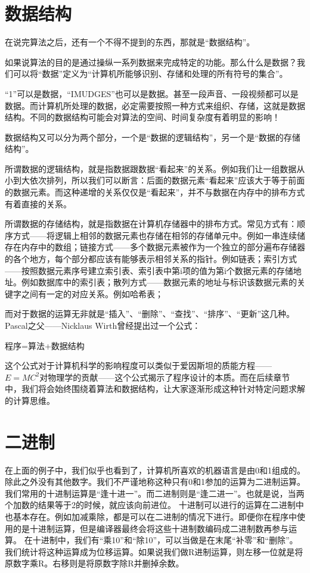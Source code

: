 \section{数据结构}
在说完算法之后，还有一个不得不提到的东西，那就是“数据结构”。

如果说算法的目的是通过操纵一系列数据来完成特定的功能。那么什么是数据？我们可以将“数据”定义为“计算机所能够识别、存储和处理的所有符号的集合”。

“1”可以是数据，“IMUDGES”也可以是数据。甚至一段声音、一段视频都可以是数据。而计算机所处理的数据，必定需要按照一种方式来组织、存储，这就是数据结构。不同的数据结构可能会对算法的空间、时间复杂度有着明显的影响！

数据结构又可以分为两个部分，一个是“数据的逻辑结构”，另一个是“数据的存储结构”。

所谓数据的逻辑结构，就是指数据跟数据“看起来”的关系。例如我们让一组数据从小到大依次排列，所以我们可以断言：后面的数据元素“看起来”应该大于等于前面的数据元素。而这种递增的关系仅仅是“看起来”，并不与数据在内存中的排布方式有着直接的关系。

所谓数据的存储结构，就是指数据在计算机存储器中的排布方式。常见方式有：顺序方式——将逻辑上相邻的数据元素也存储在相邻的存储单元中。例如一串连续储存在内存中的数组；链接方式——多个数据元素被作为一个独立的部分遍布存储器的各个地方，每个部分都应该有能够表示相邻关系的指针。例如链表；索引方式——按照数据元素序号建立索引表、索引表中第i项的值为第i个数据元素的存储地址。例如数据库中的索引表；散列方式——数据元素的地址与标识该数据元素的关键字之间有一定的对应关系。例如哈希表；

而对于数据的运算无非就是“插入”、“删除”、“查找”、“排序”、“更新”这几种。Pascal之父——Nicklaus Wirth曾经提出过一个公式：
\begin{center}
程序=算法+数据结构
\end{center}
这个公式对于计算机科学的影响程度可以类似于爱因斯坦的质能方程——$E=MC^2$对物理学的贡献——这个公式揭示了程序设计的本质。而在后续章节中，我们将会始终围绕着算法和数据结构，让大家逐渐形成这种针对特定问题求解的计算思维。

\section{二进制}
在上面的例子中，我们似乎也看到了，计算机所喜欢的机器语言是由0和1组成的。除此之外没有其他数字。我们不严谨地称这种只有0和1参加的运算为二进制运算。
我们常用的十进制运算是“逢十进一”。而二进制则是“逢二进一”。也就是说，当两个加数的结果等于2的时候，就应该向前进位。
十进制可以进行的运算在二进制中也基本存在。例如加减乘除，都是可以在二进制的情况下进行。即便你在程序中使用的是十进制运算，但是编译器最终会将这些十进制数编码成二进制数再参与运算。
在十进制中，我们有“乘10”和“除10”，可以当做是在末尾“补零”和“删除”。我们统计将这种运算成为位移运算。如果说我们做R进制运算，则左移一位就是将原数字乘R。右移则是将原数字除R并删掉余数。

